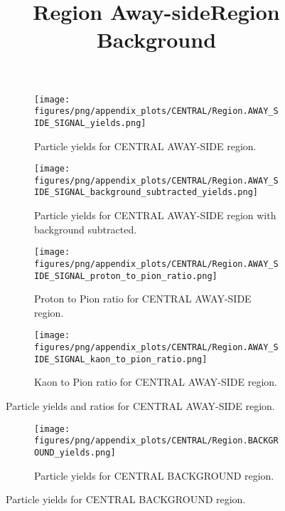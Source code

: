                 \begin{figure}[H]
                    \title{Region Away-side}
                    \begin{subfigure}[b]{0.5\textwidth}
                        \centering
                        \texttt{[image: figures/png/appendix\_plots/CENTRAL/Region.AWAY\_SIDE\_SIGNAL\_yields.png]}
                        \caption{Particle yields for CENTRAL AWAY-SIDE region.}
                        \label{fig:appendix_CENTRAL_AWAY_SIDE_SIGNAL_Inclusive_Yields}
                    \end{subfigure}
                    \begin{subfigure}[b]{0.5\textwidth}
                        \centering
                        \texttt{[image: figures/png/appendix\_plots/CENTRAL/Region.AWAY\_SIDE\_SIGNAL\_background\_subtracted\_yields.png]}
                        \caption{Particle yields for CENTRAL AWAY-SIDE region with background subtracted.}
                        \label{fig:appendix_CENTRAL_AWAY_SIDE_SIGNAL_Inclusive_Yields_Background_Subtracted}
                    \end{subfigure}
                    \begin{subfigure}[b]{0.5\textwidth}
                        \centering
                        \texttt{[image: figures/png/appendix\_plots/CENTRAL/Region.AWAY\_SIDE\_SIGNAL\_proton\_to\_pion\_ratio.png]}
                        \caption{Proton to Pion ratio for CENTRAL AWAY-SIDE region.}
                        \label{fig:appendix_CENTRAL_AWAY_SIDE_SIGNAL_Proton_to_Pion_Ratio}
                    \end{subfigure}
                    \begin{subfigure}[b]{0.5\textwidth}
                        \centering
                        \texttt{[image: figures/png/appendix\_plots/CENTRAL/Region.AWAY\_SIDE\_SIGNAL\_kaon\_to\_pion\_ratio.png]}
                        \caption{Kaon to Pion ratio for CENTRAL AWAY-SIDE region.}
                        \label{fig:appendix_CENTRAL_AWAY_SIDE_SIGNAL_Kaon_to_Pion_Ratio}
                    \end{subfigure}
                    \caption{Particle yields and ratios for CENTRAL AWAY-SIDE region.}
                    \label{fig:appendix_CENTRAL_AWAY_SIDE_SIGNAL_Inclusive_Yields_and_Ratios}
                \end{figure}
                \begin{figure}[H]
                    \title{Region Background}
                    \begin{subfigure}[b]{0.5\textwidth}
                        \centering
                        \texttt{[image: figures/png/appendix\_plots/CENTRAL/Region.BACKGROUND\_yields.png]}
                        \caption{Particle yields for CENTRAL BACKGROUND region.}
                        \label{fig:appendix_CENTRAL_BACKGROUND_Inclusive_Yields}
                    \end{subfigure}
                    \caption{Particle yields for CENTRAL BACKGROUND region.}
                    \label{fig:appendix_CENTRAL_BACKGROUND_Inclusive_Yields}
                \end{figure}
